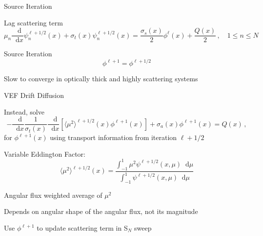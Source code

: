 \documentclass[10pt]{beamer}
\newcommand{\SN}{S$_N$\xspace}
\newcommand{\ud}{\mathop{}\!\mathrm{d}} %
\newcommand{\dderiv}[2]{\frac{\ud #1}{\ud #2}}
\newcommand{\edd}{\langle \mu^2 \rangle}
\newcommand{\relll}{^{\ell+1}} %
\newcommand{\rellh}{^{\ell+1/2}} %
\newcommand{\bracket}[1]{\left[ #1 \right]}
\begin{document}
\begin{frame}{Source Iteration}

	Lag scattering term 
	\begin{equation*} \label{eq:si}
		\mu_n \dderiv{}{x}\psi_n\rellh(x) + \sigma_t(x) \psi_n\rellh(x) = 
		\frac{\sigma_s(x)}{2} \phi^\ell(x) + \frac{Q(x)}{2} \,, \quad 1 \leq n \leq N 
	\end{equation*}

	\pause
	Source Iteration 
	\begin{equation*}
		\phi^{\ell+1} = \phi\rellh
	\end{equation*}

	\pause
	Slow to converge in optically thick and highly scattering systems 

\end{frame}

\begin{frame}{VEF Drift Diffusion}

	Instead, solve 
	\begin{equation*} \label{eq:drift}
	-\dderiv{}{x} \frac{1}{\sigma_t(x)} \dderiv{}{x} \bracket{\edd\rellh(x)\phi\relll(x)} + \sigma_a(x) \phi\relll(x) = Q(x) \,,
	\end{equation*}
	for $\phi\relll(x)$ using transport information from iteration $\ell+1/2$

	\pause 
	Variable Eddington Factor:
	\begin{equation*} \label{eq:eddington} 
		\edd\rellh(x) = \frac{\int_{-1}^1 \mu^2 \psi\rellh(x, \mu) \ud \mu}{\int_{-1}^1 \psi\rellh(x, \mu) \ud \mu}
	\end{equation*}

	\pause
	Angular flux weighted average of $\mu^2$ 

	\pause
	Depends on angular shape of the angular flux, not its magnitude 

	\pause
	Use $\phi\relll$ to update scattering term in \SN sweep 

\end{frame}
\end{document}
